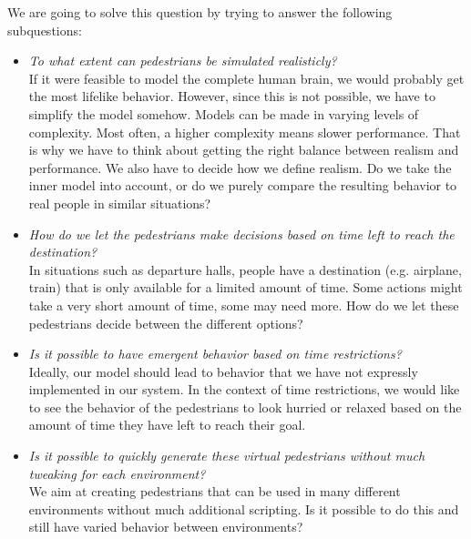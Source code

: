 \documentclass[11pt, a4paper]{book}
\begin{document}
We are going to solve this question by trying to answer the following subquestions:
\begin{itemize}
\item \emph{To what extent can pedestrians be simulated realisticly?}\\
If it were feasible to model the complete human brain, we would probably get the most lifelike behavior. However, since this is not possible, we have to simplify the model somehow. Models can be made in varying levels of complexity. Most often, a higher complexity means slower performance. That is why we have to think about getting the right balance between realism and performance. We also have to decide how we define realism. Do we take the inner model into account, or do we purely compare the resulting behavior to real people in similar situations?

\item \emph{How do we let the pedestrians make decisions based on time left to reach the destination?}\\
In situations such as departure halls, people have a destination (e.g. airplane, train) that is only available for a limited amount of time. Some actions might take a very short amount of time, some may need more. How do we let these pedestrians decide between the different options?

\item \emph{Is it possible to have emergent behavior based on time restrictions?}\\
Ideally, our model should lead to behavior that we have not expressly implemented in our system. In the context of time restrictions, we would like to see the behavior of the pedestrians to look hurried or relaxed based on the amount of time they have left to reach their goal.


\item \emph{Is it possible to quickly generate these virtual pedestrians without much tweaking for each environment?}
\\We aim at creating pedestrians that can be used in many different environments without much additional scripting. Is it possible to do this and still have varied behavior between environments?

\end{itemize}
\end{document}
